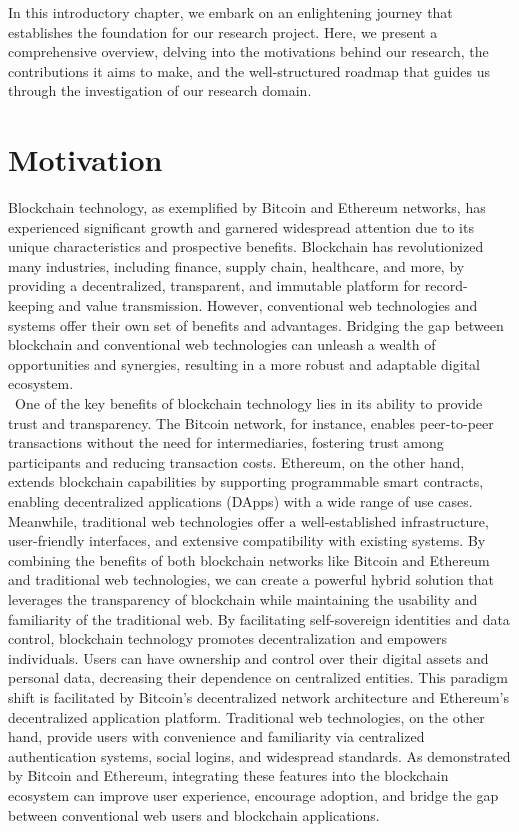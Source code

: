 \documentclass[../Main.tex]{subfiles}
\begin{document}
In this introductory chapter, we embark on an enlightening journey that establishes the foundation for our research project. Here, we present a comprehensive overview, delving into the motivations behind our research, the contributions it aims to make, and the well-structured roadmap that guides us through the investigation of our research domain.
\section{Motivation}
\label{section:1.1}
Blockchain technology, as exemplified by Bitcoin \cite{Bitcoin} and Ethereum \cite{Ethereum} networks, has experienced significant growth and garnered widespread attention due to its unique characteristics and prospective benefits. Blockchain has revolutionized many industries, including finance, supply chain, healthcare, and more, by providing a decentralized, transparent, and immutable platform for record-keeping and value transmission. However, conventional web technologies and systems offer their own set of benefits and advantages. Bridging the gap between blockchain and conventional web technologies can unleash a wealth of opportunities and synergies, resulting in a more robust and adaptable digital ecosystem. \\\
\indent One of the key benefits of blockchain technology lies in its ability to provide trust and transparency. The Bitcoin network, for instance, enables peer-to-peer transactions without the need for intermediaries, fostering trust among participants and reducing transaction costs. Ethereum, on the other hand, extends blockchain capabilities by supporting programmable smart contracts, enabling decentralized applications (DApps) with a wide range of use cases. Meanwhile, traditional web technologies offer a well-established infrastructure, user-friendly interfaces, and extensive compatibility with existing systems. By combining the benefits of both blockchain networks like Bitcoin and Ethereum and traditional web technologies, we can create a powerful hybrid solution that leverages the transparency of blockchain while maintaining the usability and familiarity of the traditional web. By facilitating self-sovereign identities and data control, blockchain technology promotes decentralization and empowers individuals. Users can have ownership and control over their digital assets and personal data, decreasing their dependence on centralized entities. This paradigm shift is facilitated by Bitcoin's decentralized network architecture and Ethereum's decentralized application platform. Traditional web technologies, on the other hand, provide users with convenience and familiarity via centralized authentication systems, social logins, and widespread standards. As demonstrated by Bitcoin and Ethereum, integrating these features into the blockchain ecosystem can improve user experience, encourage adoption, and bridge the gap between conventional web users and blockchain applications. \\\
\end{document}
